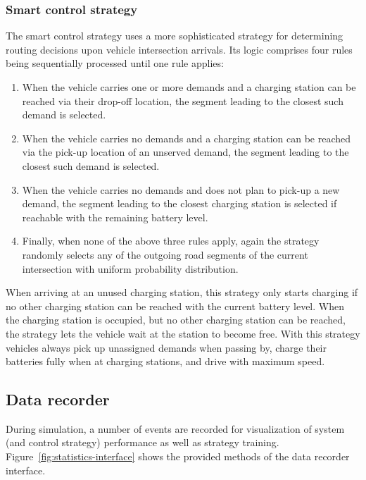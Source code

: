 \documentclass[a4paper,twoside]{article}
\begin{document}
	\subsubsection*{Smart control strategy}
	\label{sec:controller-smart}
	The smart control strategy uses a more sophisticated strategy for determining routing decisions upon vehicle intersection arrivals.
	Its logic comprises four rules being sequentially processed until one rule applies:
	\begin{enumerate}
		\item When the vehicle carries one or more demands and a charging station can be reached via their drop-off location, the segment leading to the closest such demand is selected.
		\item When the vehicle carries no demands and a charging station can be reached via the pick-up location of an unserved demand, the segment leading to the closest such demand is selected.
		\item When the vehicle carries no demands and does not plan to pick-up a new demand, the segment leading to the closest charging station is selected if reachable with the remaining battery level.
		\item Finally, when none of the above three rules apply, again the strategy randomly selects any of the outgoing road segments of the current intersection with uniform probability distribution.
	\end{enumerate}
	When arriving at an unused charging station, this strategy only starts charging if no other charging station can be reached with the current battery level.
	When the charging station is occupied, but no other charging station can be reached, the strategy lets the vehicle wait at the station to become free.
	With this strategy vehicles always pick up unassigned demands when passing by, charge their batteries fully when at charging stations, and drive with maximum speed.
	
	\subsection{Data recorder}
	\label{sec:statistics-interface}
	
	During simulation, a number of events are recorded for visualization of system (and control strategy) performance as well as strategy training.
	Figure~\ref{fig:statistics-interface} shows the provided methods of the data recorder interface.
	
\end{document}
